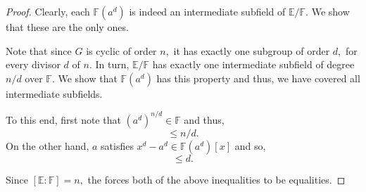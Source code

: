 \subfieldsofprimcyclic*\label{prop:subfieldsofprimcyclic2}
\begin{flushright}\hyperref[prop:subfieldsofprimcyclic]{\upsym}\end{flushright}
\begin{proof}
    Clearly, each $\mathbb{F}(a^d)$ is indeed an intermediate subfield of $\mathbb{E}/\mathbb{F}.$ We show that these are the only ones.

    Note that since $G$ is cyclic of order $n,$ it has exactly one subgroup of order $d,$ for every divisor $d$ of $n.$ In turn, $\mathbb{E}/\mathbb{F}$ has exactly one intermediate subfield of degree $n/d$ over $\mathbb{F}.$ We show that $\mathbb{F}(a^d)$ has this property and thus, we have covered all intermediate subfields.

    To this end, first note that $(a^d)^{n/d} \in \mathbb{F}$ and thus,
    \begin{equation*} 
        [\mathbb{F}(a^d) : \mathbb{F}] \le n/d.
    \end{equation*}
    On the other hand, $a$ satisfies $x^d - a^d \in \mathbb{F}(a^d)[x]$ and so,
    \begin{equation*} 
        [\mathbb{E} : \mathbb{F}(a^d)] \le d.
    \end{equation*}

    Since $[\mathbb{E} : \mathbb{F}] = n,$ the  forces both of the above inequalities to be equalities.
\end{proof}

